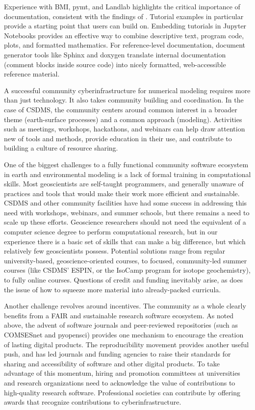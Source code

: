 \documentclass[12pt]{amsart}
\begin{document}
Experience with BMI, pymt, and Landlab highlights the critical importance of documentation, consistent with the findings of \citet{lawrence2015science}. Tutorial examples in particular provide a starting point that users can build on. Embedding tutorials in Jupyter Notebooks provides an effective way to combine descriptive text, program code, plots, and formatted mathematics. For reference-level documentation, document generator tools like Sphinx and doxygen translate internal documentation (comment blocks inside source code) into nicely formatted, web-accessible reference material.

A successful community cyberinfrastructure for numerical modeling requires more than just technology. It also takes community building and coordination. In the case of CSDMS, the community centers around common interest in a broader theme (earth-surface processes) and a common approach (modeling). Activities such as meetings, workshops, hackathons, and webinars can help draw attention new of tools and methods, provide education in their use, and contribute to building a culture of resource sharing.

One of the biggest challenges to a fully functional community software ecosystem in earth and environmental modeling is a lack of formal training in computational skills. Most geoscientists are self-taught programmers, and generally unaware of practices and tools that would make their work more efficient and sustainable. CSDMS and other community facilities have had some success in addressing this need with workshops, webinars, and summer schools, but there remains a need to scale up these efforts. Geoscience researchers should not need the equivalent of a computer science degree to perform computational research, but in our experience there is a basic set of skills that can make a big difference, but which relatively few geoscientists possess. Potential solutions range from regular university-based, geoscience-oriented courses, to focused, community-led summer courses (like CSDMS' ESPIN, or the IsoCamp program for isotope geochemistry), to fully online courses. Questions of credit and funding inevitably arise, as does the issue of how to squeeze more material into already-packed curricula.  

Another challenge revolves around incentives. The community as a whole clearly benefits from a FAIR and sustainable research software ecosystem. As noted above, the advent of software journals and peer-reviewed repositories (such as COMSESnet and pyopensci) provides one mechanism to encourage the creation of lasting digital products. The reproducibility movement provides another useful push, and has led journals and funding agencies to raise their standards for sharing and accessibility of software and other digital products. To take advantage of this momentum, hiring and promotion committees at universities and research organizations need to acknowledge the value of contributions to high-quality research software. Professional societies can contribute by offering awards that recognize contributions to cyberinfrastructure.
\end{document}
